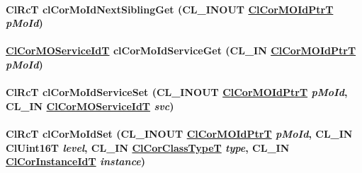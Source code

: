 \hypertarget{group__group13_ga119}{
\paragraph[clCorMoIdNextSiblingGet]{\setlength{\rightskip}{0pt plus 5cm}Cl\-Rc\-T cl\-Cor\-Mo\-Id\-Next\-Sibling\-Get (CL\_\-INOUT \hyperlink{struct_cl_cor_m_o_id}{Cl\-Cor\-MOId\-Ptr\-T} {\em p\-Mo\-Id})}\hfill}
\label{group__group13_ga119}


\hypertarget{group__group13_ga125}{
\paragraph[clCorMoIdServiceGet]{\setlength{\rightskip}{0pt plus 5cm}\hyperlink{group__group13_ga27}{Cl\-Cor\-MOService\-Id\-T} cl\-Cor\-Mo\-Id\-Service\-Get (CL\_\-IN \hyperlink{struct_cl_cor_m_o_id}{Cl\-Cor\-MOId\-Ptr\-T} {\em p\-Mo\-Id})}\hfill}
\label{group__group13_ga125}


\hypertarget{group__group13_ga126}{
\paragraph[clCorMoIdServiceSet]{\setlength{\rightskip}{0pt plus 5cm}Cl\-Rc\-T cl\-Cor\-Mo\-Id\-Service\-Set (CL\_\-INOUT \hyperlink{struct_cl_cor_m_o_id}{Cl\-Cor\-MOId\-Ptr\-T} {\em p\-Mo\-Id}, CL\_\-IN \hyperlink{group__group13_ga27}{Cl\-Cor\-MOService\-Id\-T} {\em svc})}\hfill}
\label{group__group13_ga126}


\hypertarget{group__group13_ga111}{
\paragraph[clCorMoIdSet]{\setlength{\rightskip}{0pt plus 5cm}Cl\-Rc\-T cl\-Cor\-Mo\-Id\-Set (CL\_\-INOUT \hyperlink{struct_cl_cor_m_o_id}{Cl\-Cor\-MOId\-Ptr\-T} {\em p\-Mo\-Id}, CL\_\-IN Cl\-Uint16T {\em level}, CL\_\-IN \hyperlink{group__group13_ga2}{Cl\-Cor\-Class\-Type\-T} {\em type}, CL\_\-IN \hyperlink{group__group13_ga4}{Cl\-Cor\-Instance\-Id\-T} {\em instance})}\hfill}
\label{group__group13_ga111}


